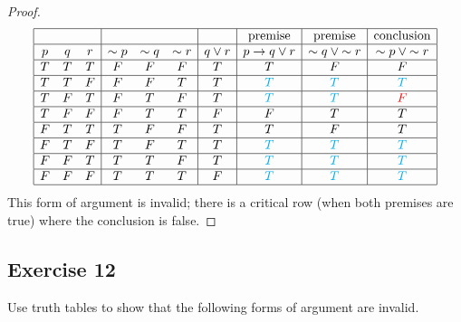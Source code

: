 \documentclass[14pt]{extarticle}
\begin{document}
\begin{proof}
    $$
        \begin{array}{|ccc|ccc|c|c|c|c|}
            \hline
              &   &   &          &          &          &          & \text{premise} & \text{premise}         & \text{conclusion}      \\
            \hline
            p & q & r & {\sim p} & {\sim q} & {\sim r} & q \vee r & p \to q \vee r & {\sim q} \vee {\sim r} & {\sim p} \vee {\sim r} \\ \hline
            T & T & T & F        & F        & F        & T        & T              & F                      & F                      \\
            \hline
            T & T & F & F        & F        & T        & T        & \color{cyan} T & \color{cyan} T         &
            \color{cyan} T                                                                                                           \\
            \hline
            T & F & T & F        & T        & F        & T        & \color{cyan} T & \color{cyan} T         & \color{red} F          \\
            \hline
            T & F & F & F        & T        & T        & F        & F              & T                      & T                      \\
            \hline
            F & T & T & T        & F        & F        & T        & T              & F                      & T                      \\
            \hline
            F & T & F & T        & F        & T        & T        & \color{cyan} T & \color{cyan} T         & \color{cyan} T         \\
            \hline
            F & F & T & T        & T        & F        & T        & \color{cyan} T & \color{cyan} T         & \color{cyan} T         \\
            \hline
            F & F & F & T        & T        & T        & F        & \color{cyan} T & \color{cyan} T         & \color{cyan} T         \\
            \hline
        \end{array}
    $$
    This form of argument is invalid; there is a critical row (when both premises are true) where the conclusion is false. \end{proof}

\subsection{Exercise 12}
Use truth tables to show that the following forms of argument are invalid.
\end{document}
